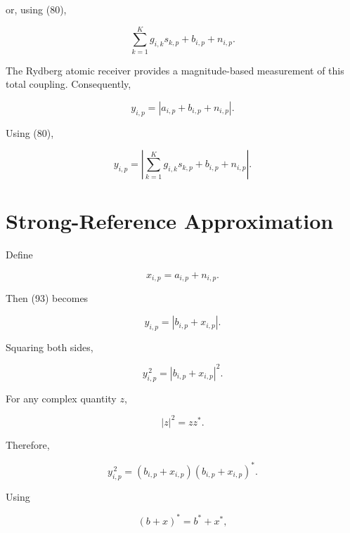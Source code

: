 \documentclass[12pt,a4paper]{article}
\begin{document}
or, using (80),

\begin{equation}
\sum_{k=1}^{K}
g_{i,k}s_{k,p}
+
b_{i,p}
+
n_{i,p}.
\tag{92}
\end{equation}

The Rydberg atomic receiver provides a magnitude-based measurement of this total coupling. Consequently,

\begin{equation}
\boxed{
y_{i,p}
=
\left|
a_{i,p}
+
b_{i,p}
+
n_{i,p}
\right|
}.
\tag{93}
\end{equation}

Using (80),

\begin{equation}
\boxed{
y_{i,p}
=
\left|
\sum_{k=1}^{K}
g_{i,k}s_{k,p}
+
b_{i,p}
+
n_{i,p}
\right|
}.
\tag{94}
\end{equation}

\section{Strong-Reference Approximation}

Define

\begin{equation}
x_{i,p}
=
a_{i,p}+n_{i,p}.
\tag{95}
\end{equation}

Then (93) becomes

\begin{equation}
y_{i,p}
=
|b_{i,p}+x_{i,p}|.
\tag{96}
\end{equation}

Squaring both sides,

\begin{equation}
y_{i,p}^{\,2}
=
|b_{i,p}+x_{i,p}|^2.
\tag{97}
\end{equation}

For any complex quantity $z$,

\begin{equation}
|z|^2=zz^*.
\tag{98}
\end{equation}

Therefore,

\begin{equation}
y_{i,p}^{\,2}
=
(b_{i,p}+x_{i,p})
(b_{i,p}+x_{i,p})^*.
\tag{99}
\end{equation}

Using

\begin{equation}
(b+x)^*=b^*+x^*,
\tag{100}
\end{equation}
\end{document}
